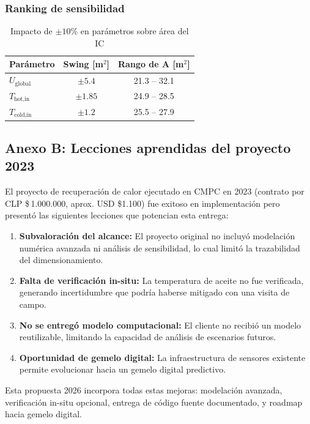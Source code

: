 \documentclass[11pt,a4paper]{article}
\begin{document}
\subsubsection{Ranking de sensibilidad}

\begin{table}[H]
\centering
\caption{Impacto de $\pm 10\%$ en parámetros sobre área del IC}
\begin{tabular}{@{}lcc@{}}
\toprule
\textbf{Parámetro} & \textbf{Swing [m$^2$]} & \textbf{Rango de A [m$^2$]} \\
\midrule
$U_{\text{global}}$ & $\pm 5.4$ & 21.3 -- 32.1 \\
$T_{\text{hot,in}}$ & $\pm 1.85$ & 24.9 -- 28.5 \\
$T_{\text{cold,in}}$ & $\pm 1.2$ & 25.5 -- 27.9 \\
\bottomrule
\end{tabular}
\end{table}

\subsection{Anexo B: Lecciones aprendidas del proyecto 2023}
\label{sec:lecciones}

El proyecto de recuperación de calor ejecutado en CMPC en 2023 (contrato por CLP \$\,1.000.000, aprox. USD \$1.100) fue exitoso en implementación pero presentó las siguientes lecciones que potencian esta entrega:

\begin{enumerate}
  \item \textbf{Subvaloración del alcance:} El proyecto original no incluyó modelación numérica avanzada ni análisis de sensibilidad, lo cual limitó la trazabilidad del dimensionamiento.
  \item \textbf{Falta de verificación in-situ:} La temperatura de aceite no fue verificada, generando incertidumbre que podría haberse mitigado con una visita de campo.
  \item \textbf{No se entregó modelo computacional:} El cliente no recibió un modelo reutilizable, limitando la capacidad de análisis de escenarios futuros.
  \item \textbf{Oportunidad de gemelo digital:} La infraestructura de sensores existente permite evolucionar hacia un gemelo digital predictivo.
\end{enumerate}

Esta propuesta 2026 incorpora todas estas mejoras: modelación avanzada, verificación in-situ opcional, entrega de código fuente documentado, y roadmap hacia gemelo digital.
\end{document}
